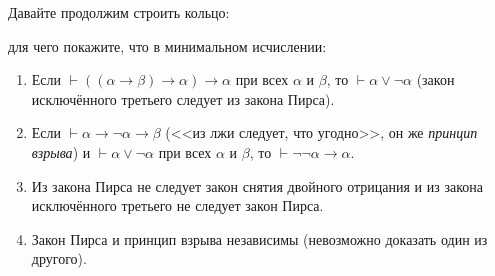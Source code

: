 \documentclass[10pt,a4paper,oneside]{article}
\begin{document}
\begin{enumerate}
Давайте продолжим строить кольцо:

\begin{center}\end{center}

для чего покажите, что в минимальном исчислении:
\begin{enumerate}
\item Если $\vdash((\alpha\rightarrow\beta)\rightarrow\alpha)\rightarrow\alpha$ при всех $\alpha$ и $\beta$, то
$\vdash\alpha\vee\neg\alpha$ (закон исключённого третьего следует из закона Пирса).
\item Если $\vdash\alpha\rightarrow\neg\alpha\rightarrow\beta$ (<<из лжи следует, что угодно>>, 
он же \emph{принцип взрыва}) и $\vdash\alpha\vee\neg\alpha$ при всех $\alpha$ и $\beta$, то $\vdash\neg\neg\alpha\rightarrow\alpha$.
\item Из закона Пирса не следует закон снятия двойного отрицания и из закона исключённого третьего не следует закон Пирса.
\item Закон Пирса и принцип взрыва независимы (невозможно доказать один из другого).
\end{enumerate}

\begin{comment}
\item Покажите аналог теоремы о дедукции для естественного вывода: $\Gamma,\alpha\vdash\beta$ тогда и только тогда, когда
$\Gamma\vdash\alpha\rightarrow\beta$.


\item Определим отображение между языками вывода (гильбертов и естественный вывод): 


\end{comment}
\end{enumerate}
\end{document}

